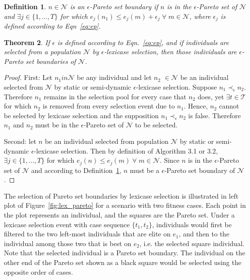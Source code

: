 \documentclass[twoside]{article}
\newtheorem{lex}{Theorem}[section]
\newtheorem{defn}[lex]{Definition}
\begin{document}
\begin{defn}\label{def:eboundary}
$n \in \mathcal{N}$ is an {\it $\epsilon$-Pareto set boundary} if $n$ is in the $\epsilon$-Pareto set of $\mathcal{N}$ and $\exists j \in \{1,\dots,T\}$ for which $e_j(n_1) \leq e_j(m)+ \epsilon_j \; \forall \; m \in \mathcal{N}$, where $\epsilon_j$ is defined according to Eqn~\ref{eq:ep}. \bigskip
\end{defn}

\begin{lex}\label{thm:eplex}
If $\epsilon$ is defined according to Eqn.~\ref{eq:ep}, and if individuals are selected from a population $\mathcal{N}$ by $\epsilon$-lexicase selection, then those individuals are $\epsilon$-Pareto set boundaries of $\mathcal{N}$.  
\end{lex}


\begin{proof}
First: Let $n_1 in \mathcal{N}$ be any individual and let $n_2$ $\in \mathcal{N}$ be an individual selected from $\mathcal{N}$ by static or semi-dynamic $\epsilon$-lexicase selection. Suppose $n_1 \prec_{\epsilon} n_2$. Therefore $n_1$ remains in the selection pool for every case that $n_2$ does, yet $\exists t \in \mathcal{T}$ for which $n_2$ is removed from every selection event due to $n_1$. Hence, $n_2$ cannot be selected by lexicase selection and the supposition $n_1 \prec_{\epsilon} n_2$ is false.  Therefore $n_1$ and $n_2$ must be in the $\epsilon$-Pareto set of $\mathcal{N}$ to be selected. 

Second: let $n$ be an individual selected from population $\mathcal{N}$ by static or semi-dynamic $\epsilon$-lexicase selection. Then by definition of Algorithm 3.1 or 3.2, $\exists j \in \{1,\dots,T\}$ for which $e_j(n) \leq e_j(m) \; \forall \; m \in \mathcal{N}$. Since $n$ is in the $\epsilon$-Pareto set of $\mathcal{N}$ and according to Definition~\ref{def:eboundary}, $n$ must be a $\epsilon$-Pareto set boundary of $\mathcal{N}$.  
\end{proof}
\bigskip

The selection of Pareto set boundaries by lexicase selection is illustrated in left plot of Figure~\ref{fig:lex_pareto} for a scenario with two fitness cases. Each point in the plot represents an individual, and the squares are the Pareto set. Under a lexicase selection event with case sequence $\{t_1, t_2\}$, individuals would first be filtered to the two left-most individuals that are elite on $e_1$, and then to the individual among those two that is best on $e_2$, i.e. the selected square individual. Note that the selected individual is a Pareto set boundary. The individual on the other end of the Pareto set shown as a black square would be selected using the opposite order of cases.  
\end{document}
